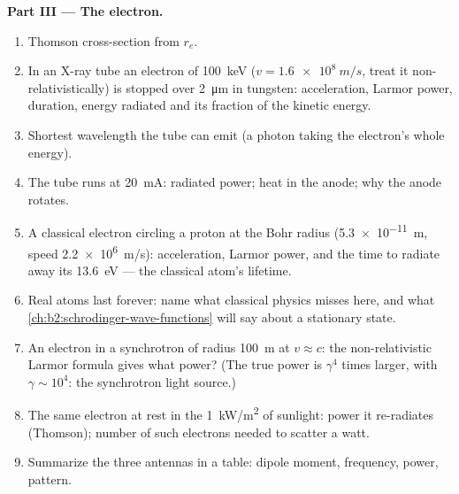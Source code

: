 \begin{problem}
\medskip
\noindent\textbf{Part III --- The electron.}
\begin{enumerate}[resume]
  \item Thomson cross-section from $r_e$.
  \item In an X-ray tube an electron of \qty{100}{keV} ($v = \qty{1.6e8}{m/s}$,
        treat it non-relativistically) is stopped over \qty{2}{\micro m} in
        tungsten: acceleration, Larmor power, duration, energy
        radiated and its fraction of the kinetic energy.
  \item Shortest wavelength the tube can emit (a photon taking the
        electron's whole energy).
  \item The tube runs at \qty{20}{mA}: radiated power; heat in the anode;
        why the anode rotates.
  \item A classical electron circling a proton at the Bohr radius
        (\qty{5.3e-11}{m}, speed \qty{2.2e6}{m/s}): acceleration, Larmor
        power, and the time to radiate away its \qty{13.6}{eV} --- the
        classical atom's lifetime.
  \item Real atoms last forever: name what classical physics misses
        here, and what \cref{ch:b2:schrodinger-wave-functions} will say
        about a stationary state.
  \item An electron in a synchrotron of radius \qty{100}{m} at $v \approx c$:
        the non-relativistic Larmor formula gives what power? (The
        true power is $\gamma^4$ times larger, with $\gamma \sim 10^4$: the
        synchrotron light source.)
  \item The same electron at rest in the \qty{1}{kW/m^2} of sunlight:
        power it re-radiates (Thomson); number of such electrons
        needed to scatter a watt.
  \item Summarize the three antennas in a table: dipole moment,
        frequency, power, pattern.
\end{enumerate}
\end{problem}
